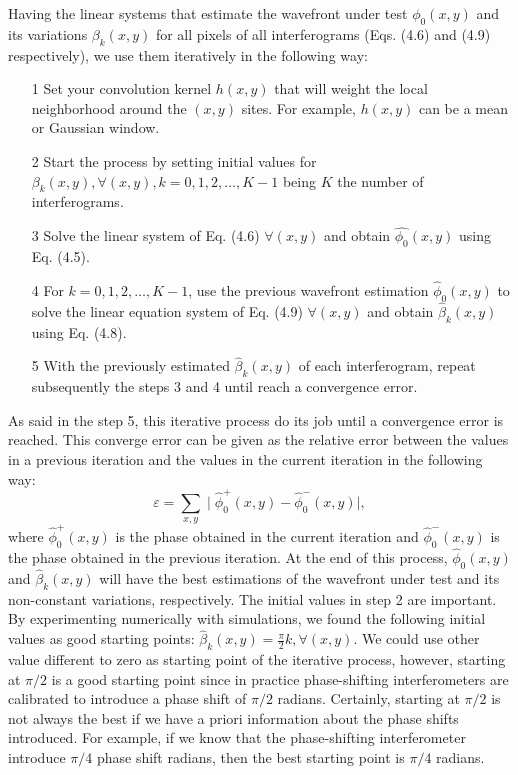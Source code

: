 Having the linear systems that estimate the wavefront under test $\phi_0(x,y)$
and its variations $\beta_k(x,y)$ for all pixels of all interferograms (Eqs.
(4.6) and (4.9) respectively), we use them iteratively in the following way:

\begin{itemize}
 \item[1] Set your convolution kernel $h(x,y)$ that will weight the local
 neighborhood around the $(x,y)$ sites. For example, $h(x,y)$ can be a mean or
 Gaussian window.
 \item[2] Start the process by setting initial values for $\beta_k(x,y),
 \forall (x,y), k = 0,1,2,\dots,K-1$ being $K$ the number of interferograms.
 \item[3] Solve the linear system of Eq. (4.6) $\forall(x,y)$ and obtain 
 $\hat{\phi_0} (x,y)$ using Eq. (4.5).
 \item[4] For $k = 0,1,2,\dots,K-1$, use the previous wavefront estimation
 $\hat{\phi}_0 (x,y)$ to solve the linear equation system of Eq. (4.9)
 $\forall(x,y)$ and obtain $\hat{\beta}_k(x,y)$ using Eq. (4.8).
 \item[5] With the previously estimated $\hat{\beta}_k(x,y)$ of each
 interferogram, repeat subsequently the steps 3 and 4 until reach a convergence
 error.
\end{itemize}
As said in the step 5, this iterative process do its job until a convergence
error is reached. This converge error can be given as the relative error
between the values in a previous iteration and the values in the current
iteration in the following way:
\begin{equation}
 \varepsilon=\sum_{x,y}\mid\hat{\phi}_{0}^{+}(x,y)-\hat{\phi}_{0}^{-}(x,y)
 \mid,
\end{equation}
where $\hat{\phi}_{0}^{+}(x,y)$ is the phase obtained in the current iteration
and $\hat{\phi}_{0}^{-}(x,y)$ is the phase obtained in the previous iteration.
At the end of this process, $\hat{\phi}_{0}(x,y)$ and $\hat{\beta}_k(x,y)$
will have the best estimations of the wavefront under test and its non-constant
variations, respectively. The initial values in step 2 are important. By
experimenting numerically with simulations, we found the following initial
values as good starting points: $\hat{\beta}_k(x,y) = \frac{\pi}{2}k, 
\forall(x,y)$. We could use other value different to zero as starting point of
the iterative process, however, starting at $\pi/2$ is a good starting point
since in practice phase-shifting interferometers are calibrated to introduce
a phase shift of $\pi/2$ radians. Certainly, starting at $\pi/2$ is not always
the best if we have a priori information about the phase shifts introduced. For
example, if we know that the phase-shifting interferometer introduce $\pi/4$
phase shift radians, then the best starting point is $\pi/4$ radians.


